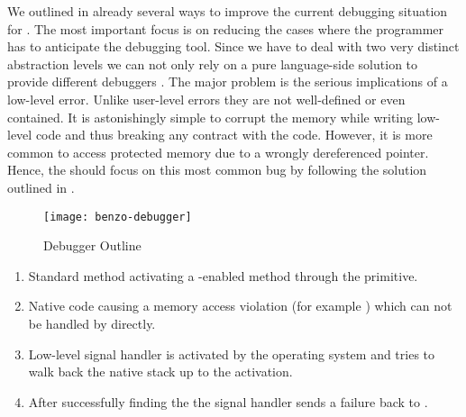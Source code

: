 We outlined in  already several ways to improve the current debugging situation for \B.
The most important focus is on reducing the cases where the programmer has to anticipate the debugging tool.
Since we have to deal with two very distinct abstraction levels we can not only rely on a pure language-side solution to provide different debuggers \cite{Towards a Moldable Debugger}.
The major problem is the serious implications of a low-level error.
Unlike user-level errors they are not well-defined or even contained.
It is astonishingly simple to corrupt the \VM memory while writing low-level code and thus breaking any contract with the \VM code.
However, it is more common to access protected memory due to a wrongly dereferenced pointer.
Hence, the \B should focus on this most common bug by following the solution outlined in .
%
\begin{figure}[h]
	\centering
	\texttt{[image: benzo-debugger]}
	\caption{\B Debugger Outline}
\end{figure}
%
\begin{enumerate}
	\item Standard \PH method activating a \B-enabled method through the  primitive.
	\item Native code causing a memory access violation (for example ) which can not be handled by \PH directly.
	\item Low-level signal handler is activated by the operating system and tries to walk back the native stack up to the  activation.
	\item After successfully finding the  the signal handler sends a \B failure back to \PH.
\end{enumerate}

